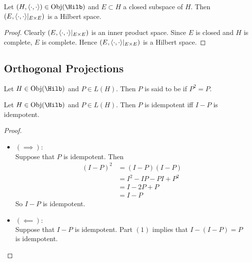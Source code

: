 \documentclass{book}
\begin{document}
\begin{ex}
	Let $(H, \l \cdot, \cdot \r) \in \Obj(\Hilb)$ and $E \subset H$ a closed subspace of $H$. Then $(E, \langle \cdot, \cdot \rangle|_{E \times E})$ is a Hilbert space.  
\end{ex}

\begin{proof}
	Clearly $(E, \langle \cdot, \cdot \rangle|_{E \times E})$ is an inner product space. Since $E$ is closed and $H$ is complete, $E$ is complete. Hence $(E, \langle \cdot, \cdot \rangle|_{E \times E})$ is a Hilbert space.
\end{proof}












































\subsection{Orthogonal Projections}

\begin{defn}
	Let $H \in \Obj(\Hilb)$ and $P \in L(H)$. Then $P$ is said to be  if $P^2 = P$.
\end{defn}

\begin{ex}
	Let $H \in \Obj(\Hilb)$ and $P \in L(H)$. Then $P$ is idempotent iff $I - P$ is idempotent.
\end{ex}

\begin{proof}\
	\begin{itemize}
		\item $(\implies)$: \\
		Suppose that $P$ is idempotent. Then 
		\begin{align*}
			(I - P)^2
			& = (I - P)(I - P) \\
			& = I^2 - IP - PI + P^2 \\
			& = I -2P + P \\
			& = I - P
		\end{align*}
		So $I -P$ is idempotent.
		\item $(\impliedby):$ \\
		Suppose that $I - P$ is idempotent. Part $(1)$ implies that $I - (I - P) = P$ is idempotent.
	\end{itemize}
\end{proof}
\end{document}
